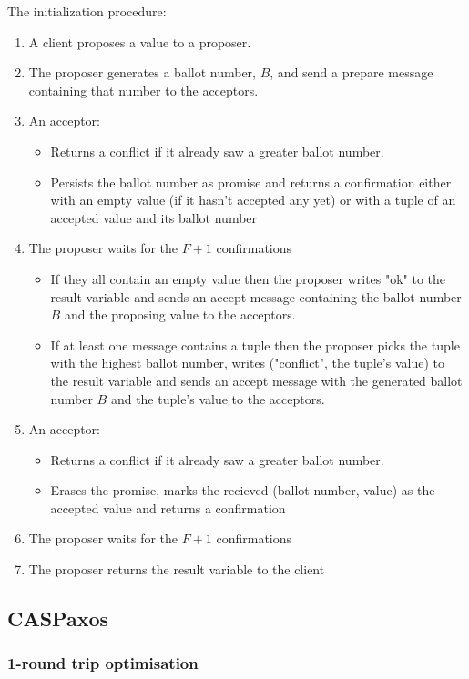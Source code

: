 \documentclass[12pt]{article}
\begin{document}
The initialization procedure:
\begin{enumerate}
  \item A client proposes a value to a proposer.
  \item The proposer generates a ballot number, $B$, and send a prepare message containing that number to the acceptors.
  \item An acceptor:
  \begin{itemize}
    \item Returns a conflict if it already saw a greater ballot number.
    \item Persists the ballot number as promise and returns a confirmation either with an empty value (if it hasn't accepted any yet) or with a tuple of an accepted value and its ballot number
  \end{itemize}
  \item The proposer waits for the $F+1$ confirmations
  \begin{itemize}
    \item If they all contain an empty value then the proposer writes "ok" to the result variable and sends an accept message containing the ballot number $B$ and the proposing value to the acceptors.
    \item If at least one message contains a tuple then the proposer picks the tuple with the highest ballot number, writes ("conflict", the tuple's value) to the result variable and sends an accept message with the generated ballot number $B$ and the tuple's value to the acceptors.
  \end{itemize}
  \item An acceptor:
  \begin{itemize}
    \item Returns a conflict if it already saw a greater ballot number.
    \item Erases the promise, marks the recieved (ballot number, value) as the accepted value and returns a confirmation
  \end{itemize}
  \item The proposer waits for the $F+1$ confirmations
  \item The proposer returns the result variable to the client
\end{enumerate}

\subsection{CASPaxos}
\subsubsection{1-round trip optimisation}
\end{document}
